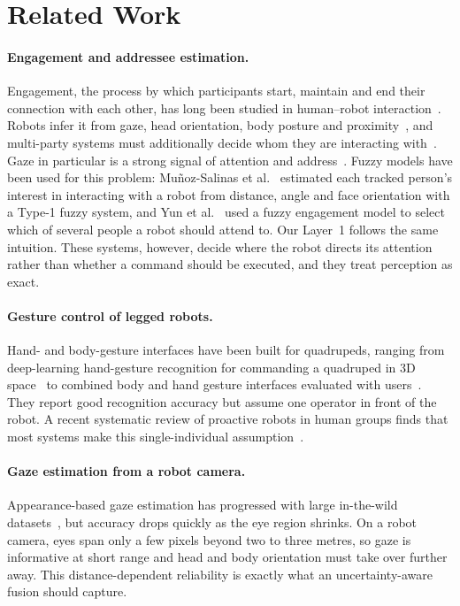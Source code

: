 \section{Related Work}
\label{sec:related}

\paragraph{Engagement and addressee estimation.}
Engagement, the process by which participants start, maintain and end their
connection with each other, has long been studied in human--robot
interaction~\cite{sidner2005engagement}. Robots infer it from gaze, head
orientation, body posture and proximity~\cite{rich2010recognizing,
foster2017engagement}, and multi-party systems must additionally decide whom
they are interacting with~\cite{bohus2009multiparty,vazquez2017towards}.
Gaze in particular is a strong signal of attention and
address~\cite{admoni2017gaze}. Fuzzy models have been used for this problem:
Mu\~noz-Salinas et al.~\cite{munoz2005fuzzy} estimated each tracked person's
interest in interacting with a robot from distance, angle and face
orientation with a Type-1 fuzzy system, and Yun et al.~\cite{yun2012intention}
used a fuzzy engagement model to select which of several people a robot
should attend to. Our Layer~1 follows the same intuition. These systems,
however, decide where the robot directs its attention rather than whether a
command should be executed, and they treat perception as exact.

\paragraph{Gesture control of legged robots.}
Hand- and body-gesture interfaces have been built for quadrupeds, ranging from
deep-learning hand-gesture recognition for commanding a quadruped in 3D
space~\cite{hyperpalm2022} to combined body and hand gesture interfaces
evaluated with users~\cite{quadgesture2024}. They report good recognition
accuracy but assume one operator in front of the robot. A recent systematic
review of proactive robots in human groups finds that most systems make this
single-individual assumption~\cite{grouprobots2026review}.

\paragraph{Gaze estimation from a robot camera.}
Appearance-based gaze estimation has progressed with large in-the-wild
datasets~\cite{zhang2019mpiigaze,kellnhofer2019gaze360}, but accuracy drops
quickly as the eye region shrinks. On a robot camera, eyes span only a few
pixels beyond two to three metres, so gaze is informative at short range and
head and body orientation must take over further away. This
distance-dependent reliability is exactly what an uncertainty-aware fusion
should capture.

